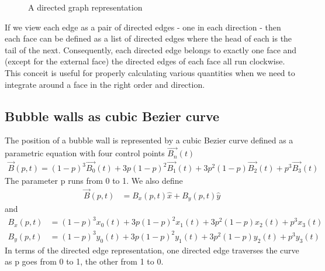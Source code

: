 \documentclass{article}
\begin{document}
\begin{figure}[h]
\centering
{}
\caption{A directed graph representation}
\end{figure}

If we view each edge as a pair of directed edges - one in each direction - then
each face can be defined as a list of directed edges where the head of each
is the tail of the next. Consequently, each directed edge belongs to exactly
one face and (except for the external face) the directed edges of each face all
run clockwise. This conceit is useful for properly calculating various quantities
when we need to integrate around a face in the right order and direction.
\subsection{Bubble walls as cubic Bezier curve}
The position of a bubble wall is represented by a cubic Bezier curve defined as
a parametric equation with four control points $\vec{B_n}(t)$
\begin{align}
\vec{B}(p,t)=(1-p)^3\vec{B_0}(t)+3p(1-p)^2\vec{B_1}(t)+3p^2(1-p)\vec{B_2}(t)+p^3\vec{B_3}(t)
\end{align}
The parameter p runs from 0 to 1. We also define
\begin{align}
\vec{B}(p,t)&=B_x(p,t)\hat{x} +B_y(p,t)\hat{y}
\end{align}
and
\begin{subequations}
\begin{align}
B_x(p,t)&=(1-p)^3x_0(t)+3p(1-p)^2x_1(t)+3p^2(1-p)x_2(t)+p^3x_3(t)\\
B_y(p,t)&=(1-p)^3y_0(t)+3p(1-p)^2y_1(t)+3p^2(1-p)y_2(t)+p^3y_3(t)
\end{align}
\end{subequations}
In terms of the directed edge representation, one directed edge traverses the
curve as p goes from 0 to 1, the other from 1 to 0.
\clearpage
\end{document}
